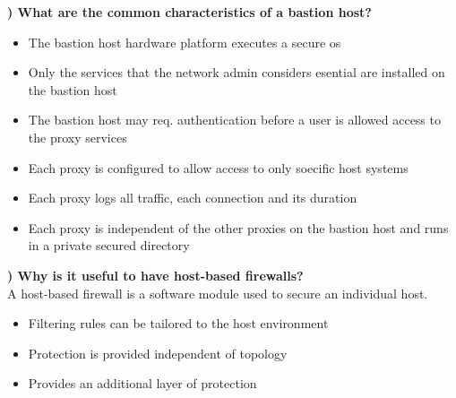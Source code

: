 \documentclass{report}
\newcommand{\mysubsection}[2]{\textbf{\romannumeral #1) #2}}
\begin{document}
\noindent\mysubsection{9}{What are the common characteristics of a bastion host?}
\begin{itemize}
  \item{The bastion host hardware platform executes a secure os} 
  \item{Only the services that the network admin considers esential are
    installed on the bastion host} 
  \item{The bastion host may req. authentication before a user is allowed
    access to the proxy services} 
  \item{Each proxy is configured to allow access to only soecific host systems} 
  \item{Each proxy logs all traffic, each connection and its duration} 
  \item{Each proxy is independent of the other proxies on the bastion host and
    runs in a private secured directory} 
\end{itemize}


\noindent\mysubsection{10}{Why is it useful to have host-based firewalls?}
\\A host-based firewall is a software module used to secure an individual host.
\begin{itemize}
  \item{Filtering rules can be tailored to the host environment} 
  \item{Protection is provided independent of topology} 
  \item{Provides an additional layer of protection} 
\end{itemize}



\end{document}
